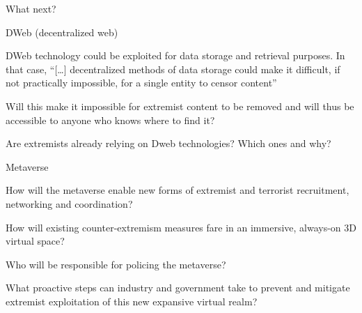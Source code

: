 \documentclass[nobackground,dvipsnames,table]{beamer}
\begin{document}
\begin{frame}{What next?}
\footnotesize{
DWeb (decentralized web)
\begin{itemize}
\footnotesize{
    \item DWeb technology could be exploited for data storage and retrieval purposes. In that case, “[…] decentralized methods of data storage could make it difficult, if not practically impossible, for a single entity to censor content”
    \item Will this make it impossible for extremist content to be removed and will thus be accessible to anyone who knows where to find it?
    \item Are extremists already relying on Dweb technologies? Which ones and why?
    }
\end{itemize}

Metaverse
\begin{itemize}
\footnotesize{
    \item How will the metaverse enable new forms of extremist and terrorist recruitment, networking and coordination?
    \item How will existing counter-extremism measures fare in an immersive, always-on 3D virtual space?
    \item Who will be responsible for policing the metaverse? 
    \item What proactive steps can industry and government take to prevent and mitigate extremist exploitation of this new expansive virtual realm?}
\end{itemize}
}
\end{frame}
\end{document}
